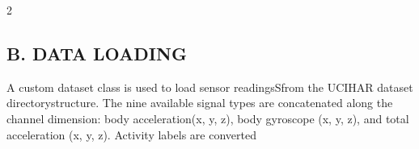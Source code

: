 \documentclass{article}
\begin{document}
\begin{paracol}{2}
\subsection*{B. DATA LOADING}


A custom dataset class is used to load sensor readingsSfrom the UCIHAR dataset directorystructure. The nine available signal types are concatenated along the channel dimension: body acceleration(x, y, z), body gyroscope (x, y, z), and total
acceleration (x, y, z). Activity labels are converted

\end{paracol}
\end{document}

